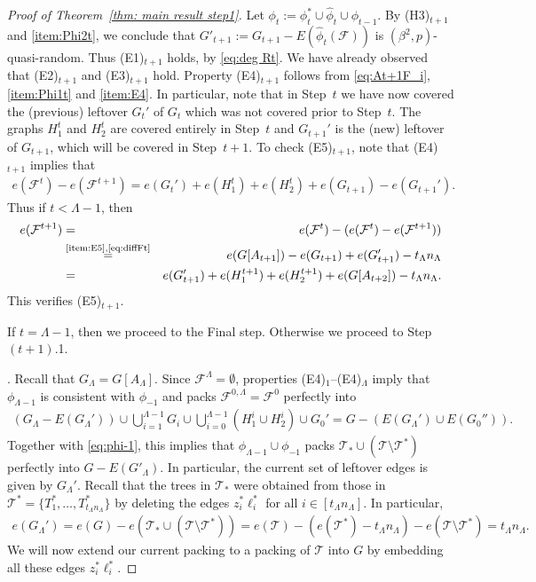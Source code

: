 \documentclass[a4paper, 11pt, reqno]{amsart}
\numberwithin{equation}{section}
\newcommand{\1}{{\rm 1\hspace*{-0.4ex}%
\rule{0.1ex}{1.52ex}\hspace*{0.2ex}}}
\newcommand{\es}{\emptyset}
\newcommand{\cF}{\mathcal{F}}
\newcommand{\cT}{\mathcal{T}}
\newcommand{\sm}{\setminus}
\newcounter{step}
\begin{document}
\begin{proof}[Proof of Theorem~\ref{thm: main result step1}]
Let $\phi_t:=\phi_t^*\cup \hat{\phi}_t\cup \phi_{t-1}$.
By (H3)$_{t+1}$ and \ref{item:Phi2t}, 
we conclude that $G'_{t+1}:= G_{t+1} -  E(\hat{\phi}_{t}(\cF))$ is $(\beta^2,p)$-quasi-random.
Thus (E1)$_{t+1}$ holds, by \eqref{eq:deg Rt}.
We have already observed that (E2)$_{t+1}$ and (E3)$_{t+1}$ hold.
Property (E4)$_{t+1}$ follows from \eqref{eq:At+1F_i}, \ref{item:Phi1t} and \ref{item:E4}.
In particular,
note that in Step~$t$ we have now covered the (previous) leftover $G_t'$ of $G_t$ which was not covered prior to Step~$t$.
The graphs $H_1^t$ and $H_2^t$ are covered entirely in Step~$t$ and $G_{t+1}'$ is the (new) leftover of $G_{t+1}$,
which will be covered in Step~$t+1$.
To check (E5)$_{t+1}$,
note that (E4)$_{t+1}$ implies that 
\begin{align}\label{eq:diffFt}
	e(\cF^t)-e(\cF^{t+1})=e(G_t')+e(H_1^t)+e(H_2^t)+e(G_{t+1})-e(G_{t+1}').
\end{align}
Thus if $t<\Lambda-1$, then
\begin{eqnarray*}
e(\cF^{t+1})
&=& e(\cF^{t})-(e(\cF^{t})-e(\cF^{t+1}))\\
&\stackrel{\text{\ref{item:E5},\eqref{eq:diffFt}}}{=}& e(G[A_{t+1}]) -e(G_{t+1})+e(G_{t+1}')- t_{\Lambda}n_{\Lambda}
\\
&=&e(G_{t+1}')+ e(H_1^{t+1})+e(H_2^{t+1})+e(G[A_{t+2}])-t_{\Lambda}n_{\Lambda}.
\end{eqnarray*}
This verifies (E5)$_{t+1}$.

If $t=\Lambda-1$, then we proceed to the Final step. Otherwise we proceed to Step $(t+1)$.1.
\newline


.
Recall that $G_{\Lambda}=G[A_\Lambda]$.
Since $\cF^{\Lambda}=\es$,
properties (E4)$_1$--(E4)$_\Lambda$ imply that $\phi_{\Lambda-1}$ is consistent with $\phi_{-1}$ and packs $\cF^{0,\Lambda}=\cF^0$ perfectly into
\begin{align*}
	(G_\Lambda-E(G_\Lambda'))\cup \bigcup_{i=1}^{\Lambda-1}G_i \cup \bigcup_{i=0}^{\Lambda-1}(H_1^i\cup H_2^i)\cup G_0'
	=G-(E(G_\Lambda')\cup E(G_0'')).
\end{align*}
Together with \eqref{eq:phi-1}, this implies that $\phi_{\Lambda-1}\cup \phi_{-1}$ packs
$\cT_{*}\cup (\cT\sm \cT^*)$ perfectly into $G-E(G'_\Lambda)$.
In particular,
the current set of leftover edges is given by $G_\Lambda'$.
Recall that the trees in $\cT_*$ were obtained from those in $\cT^*=\{T_1^*,\ldots,T^*_{t_\Lambda n_\Lambda}\}$ by deleting the edges $z^*_i\ell_i^*$ for all $i\in [t_\Lambda n_\Lambda]$.
In particular,
\begin{align}\label{eq:edgeslast1}
	e(G_{\Lambda}')
	=e(G)-e(\cT_*\cup (\cT\sm \cT^*))
	=e(\cT)-(e(\cT^*)-t_\Lambda n_\Lambda)- e(\cT\sm \cT^*)
	=t_\Lambda n_\Lambda.
\end{align}
We will now extend our current packing to a packing of $\cT$ into $G$ by embedding all these edges $z^*_i\ell_i^*$.


\end{proof}
\end{document}
